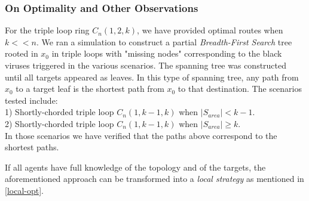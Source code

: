  


\subsubsection{On Optimality and Other Observations}
 

 For the triple loop ring $C_n(1,2,k)$, we have  provided optimal routes when $k<<n$. We ran a simulation to construct a partial  {\it Breadth-First Search} tree rooted in $x_0$ 
in triple loops  with "missing nodes" corresponding to the black viruses triggered in the various scenarios. The spanning tree was constructed until all targets appeared as leaves. In this type of spanning tree, any path from $x_0$ to a target leaf is the shortest path from $x_0$  to that destination. The scenarios tested include: \\
 1) Shortly-chorded triple loop $C_n(1,k-1,k)$ when $|S_{area}|<k-1$.\\
 2) Shortly-chorded triple loop $C_n(1,k-1,k)$ when $|S_{area}|\ge k$.\\
In those scenarios we have verified that the paths above correspond to the shortest paths.

\medbreak

If all agents have full knowledge of the topology and of the targets, the aforementioned approach can be transformed into a {\em local strategy} as mentioned in \ref{local-opt}.





